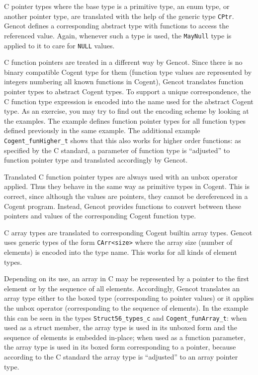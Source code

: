 \documentclass[a4paper]{report}
\newcommand{\code}[1]{\textnormal{\texttt{#1}}}
\begin{document}
C pointer types where the base type is a primitive type, an enum type, or another pointer type, are translated with the
help of the generic type \code{CPtr}. Gencot defines a corresponding abstract type with functions to access the 
referenced value. Again, whenever such a type is used, the \code{MayNull} type is applied to it to care for \code{NULL} 
values.

C function pointers are treated in a different way by Gencot. Since there is no binary compatible Cogent type for them 
(function type values are represented by integers numbering all known functions in Cogent), Gencot translates function pointer
types to abstract Cogent types. To support a unique correspondence, the C function type expression is encoded into
the name used for the abstract Cogent type. As an exercise, you may try to find out the encoding scheme by looking
at the examples. The example defines function pointer types for all function types defined previously in the same example. 
The additional example \code{Cogent\_funHigher\_t} shows that this also works for higher order functions: as specified by the 
C standard, a parameter of function type is ``adjusted'' to function pointer type and translated accordingly by Gencot.

Translated C function pointer types are always used with an unbox operator applied. Thus they behave in the same way as 
primitive types in Cogent. This is correct, since although the values are pointers, they cannot be dereferenced in 
a Cogent program. Instead, Gencot provides functions to convert between these pointers and values of the corresponding
Cogent function type.

C array types are translated to corresponding Cogent builtin array types. Gencot
uses generic types of the form \code{CArr<size>} where the array size (number of elements) is encoded into the type name.
This works for all kinds of element types.

Depending on its use, an array in C may be represented by a pointer to the first element or by the sequence of all elements.
Accordingly, Gencot translates an array type either to the boxed type (corresponding to pointer values) or it
applies the unbox operator (corresponding to the sequence of elements). In the example this can be seen in the types 
\code{Struct56\_types\_c} and \code{Cogent\_funArray\_t}: when used as a struct member, the array type is used in its unboxed
form and the sequence of elements is embedded in-place; when used as a function parameter, the array type is used in 
its boxed form corresponding to a pointer, because according to the C standard the array type is ``adjusted'' to an array
pointer type.
\end{document}
